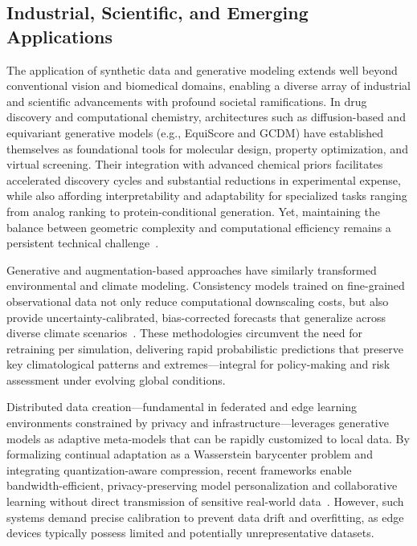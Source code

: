 \subsection{Industrial, Scientific, and Emerging Applications}

The application of synthetic data and generative modeling extends well beyond conventional vision and biomedical domains, enabling a diverse array of industrial and scientific advancements with profound societal ramifications. In drug discovery and computational chemistry, architectures such as diffusion-based and equivariant generative models (e.g., EquiScore and GCDM) have established themselves as foundational tools for molecular design, property optimization, and virtual screening. Their integration with advanced chemical priors facilitates accelerated discovery cycles and substantial reductions in experimental expense, while also affording interpretability and adaptability for specialized tasks ranging from analog ranking to protein-conditional generation. Yet, maintaining the balance between geometric complexity and computational efficiency remains a persistent technical challenge~\cite{ref59,ref74}.

Generative and augmentation-based approaches have similarly transformed environmental and climate modeling. Consistency models trained on fine-grained observational data not only reduce computational downscaling costs, but also provide uncertainty-calibrated, bias-corrected forecasts that generalize across diverse climate scenarios~\cite{ref73}. These methodologies circumvent the need for retraining per simulation, delivering rapid probabilistic predictions that preserve key climatological patterns and extremes—integral for policy-making and risk assessment under evolving global conditions.

Distributed data creation—fundamental in federated and edge learning environments constrained by privacy and infrastructure—leverages generative models as adaptive meta-models that can be rapidly customized to local data. By formalizing continual adaptation as a Wasserstein barycenter problem and integrating quantization-aware compression, recent frameworks enable bandwidth-efficient, privacy-preserving model personalization and collaborative learning without direct transmission of sensitive real-world data~\cite{ref72}. However, such systems demand precise calibration to prevent data drift and overfitting, as edge devices typically possess limited and potentially unrepresentative datasets.

